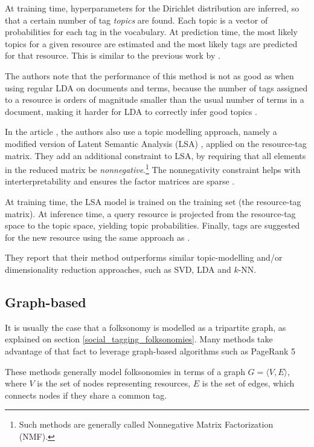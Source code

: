 At training time, hyperparameters for the Dirichlet distribution are inferred, so that a certain number of tag \textit{topics} are found. Each topic is a vector of probabilities for each tag in the vocabulary. At prediction time, the most likely topics for a given resource are estimated and the most likely tags are predicted for that resource. This is similar to the previous work by \cite{si_sun_2008}.

The authors note that the performance of this method is not as good as when using regular LDA on documents and terms, because the number of tags assigned to a resource is orders of magnitude smaller than the usual number of terms in a document, making it harder for LDA to correctly infer good topics \citep{krestel_fankhauser_2010}.

In the article \cite{zhang_etal_2014}, the authors also use a topic modelling approach, namely a modified version of Latent Semantic Analysis (LSA) \citep{deerwester_etal_1990}, applied on the resource-tag matrix. They add an additional constraint to LSA, by requiring that all elements in the reduced matrix be \textit{nonnegative}.\footnote{Such methods are generally called Nonnegative Matrix Factorization (NMF).} The nonnegativity constraint helps with interterpretability and ensures the factor matrices are sparse \citep{gillis_2014}.

At training time, the LSA model is trained on the training set (the resource-tag matrix). At inference time, a query resource is projected from the resource-tag space to the topic space, yielding topic probabilities. Finally, tags are suggested for the new resource using the same approach as \cite{si_sun_2008}.

They report that their method outperforms similar topic-modelling and/or dimensionality reduction approaches, such as SVD, LDA and $k$-NN.

\subsection{Graph-based}

It is usually the case that a folksonomy is modelled as a tripartite graph, as explained on section \ref{social_tagging_folksonomies}. Many methods take advantage of that fact to leverage graph-based algorithms such as PageRank 5

These methods generally model folksonomies in terms of a graph $G=\langle V,E \rangle$, where $V$ is the set of nodes representing resources, $E$ is the set of edges, which connects nodes if they share a common tag.

